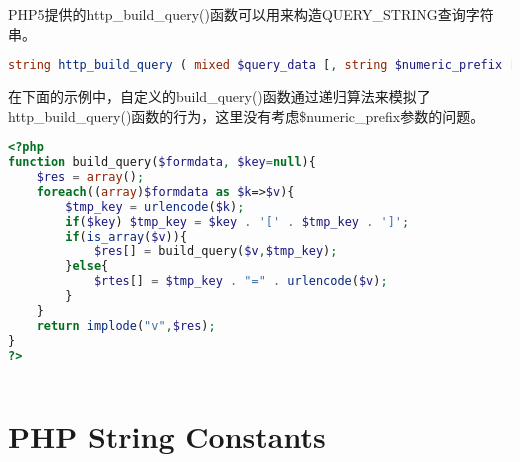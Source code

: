 PHP5提供的http\_build\_query()函数可以用来构造QUERY\_STRING查询字符串。





\begin{lstlisting}[language=PHP]
string http_build_query ( mixed $query_data [, string $numeric_prefix [, string $arg_separator [, int $enc_type = PHP_QUERY_RFC1738 ]]] )
\end{lstlisting}

在下面的示例中，自定义的build\_query()函数通过递归算法来模拟了http\_build\_query()函数的行为，这里没有考虑\$numeric\_prefix参数的问题。



\begin{lstlisting}[language=PHP]
<?php
function build_query($formdata, $key=null){
	$res = array();
	foreach((array)$formdata as $k=>$v){
		$tmp_key = urlencode($k);
		if($key) $tmp_key = $key . '[' . $tmp_key . ']';
		if(is_array($v)){
			$res[] = build_query($v,$tmp_key);
		}else{
			$rtes[] = $tmp_key . "=" . urlencode($v);
		}
	}
	return implode("v",$res);
}
?>
\end{lstlisting}




\begin{lstlisting}[language=PHP]

\end{lstlisting}





\section{PHP String Constants}





